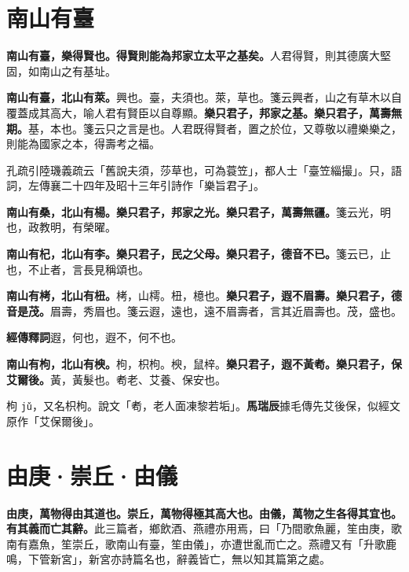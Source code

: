 \section{南山有臺}


\textbf{南山有臺，樂得賢也。得賢則能為邦家立太平之基矣。}{\footnotesize 人君得賢，則其德廣大堅固，如南山之有基址。}

\textbf{南山有臺，北山有萊。}{\footnotesize 興也。臺，夫須也。萊，草也。箋云興者，山之有草木以自覆蓋成其高大，喻人君有賢臣以自尊顯。}\textbf{樂只君子，邦家之基。樂只君子，萬壽無期。}{\footnotesize 基，本也。箋云只之言是也。人君既得賢者，置之於位，又尊敬以禮樂樂之，則能為國家之本，得壽考之福。}

\begin{quoting}孔疏引陸璣義疏云「舊說夫須，莎草也，可為蓑笠」，都人士「臺笠緇撮」。只，語詞，左傳襄二十四年及昭十三年引詩作「樂旨君子」。\end{quoting}

\textbf{南山有桑，北山有楊。樂只君子，邦家之光。樂只君子，萬壽無疆。}{\footnotesize 箋云光，明也，政教明，有榮曜。}

\textbf{南山有杞，北山有李。樂只君子，民之父母。樂只君子，德音不已。}{\footnotesize 箋云已，止也，不止者，言長見稱頌也。}

\textbf{南山有栲，北山有杻。}{\footnotesize 栲，山樗。杻，檍也。}\textbf{樂只君子，遐不眉壽。樂只君子，德音是茂。}{\footnotesize 眉壽，秀眉也。箋云遐，遠也，遠不眉壽者，言其近眉壽也。茂，盛也。}

\begin{quoting}\textbf{經傳釋詞}遐，何也，遐不，何不也。\end{quoting}

\textbf{南山有枸，北山有楰。}{\footnotesize 枸，枳枸。楰，鼠梓。}\textbf{樂只君子，遐不黃耇。樂只君子，保艾爾後。}{\footnotesize 黃，黃髮也。耇老、艾養、保安也。}

\begin{quoting}枸 \texttt{jǔ}，又名枳枸。說文「耇，老人面凍黎若垢」。\textbf{馬瑞辰}據毛傳先艾後保，似經文原作「艾保爾後」。\end{quoting}

\section{由庚·崇丘·由儀}

\textbf{由庚，萬物得由其道也。崇丘，萬物得極其高大也。由儀，萬物之生各得其宜也。有其義而亡其辭。}{\footnotesize 此三篇者，鄉飲酒、燕禮亦用焉，曰「乃間歌魚麗，笙由庚，歌南有嘉魚，笙崇丘，歌南山有臺，笙由儀」，亦遭世亂而亡之。燕禮又有「升歌鹿鳴，下管新宮」，新宮亦詩篇名也，辭義皆亡，無以知其篇第之處。}

